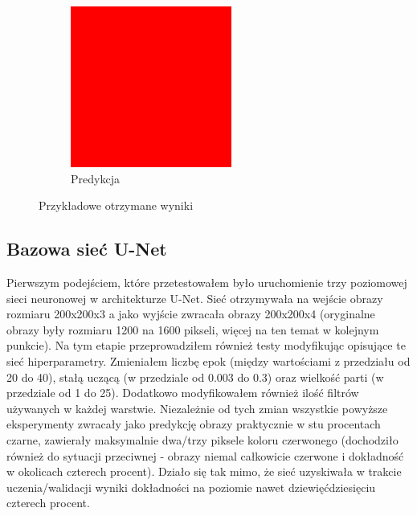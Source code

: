 \documentclass{article}
\begin{document}
\begin{figure}[H]
\begin{subfigure}{0.4\linewidth}
        \includegraphics[width=\linewidth]{images/0_0_0_prediction.png}
        \caption{Predykcja}
    \end{subfigure}
    \caption{Przykładowe otrzymane wyniki}
    \label{fig:input_and_output}
\end{figure}
\subsection{Bazowa sieć U-Net}
Pierwszym podejściem, które przetestowałem było uruchomienie trzy poziomowej sieci neuronowej w architekturze U-Net.
Sieć otrzymywała na wejście obrazy rozmiaru 200x200x3 a jako wyjście zwracała obrazy 200x200x4 (oryginalne obrazy były rozmiaru 1200 na 1600 pikseli, więcej na ten temat w kolejnym punkcie).
Na tym etapie przeprowadziłem również testy modyfikując opisujące te sieć hiperparametry.
Zmieniałem liczbę epok (między wartościami z przedziału od 20 do 40), stałą uczącą (w przedziale od 0.003 do 0.3) oraz wielkość parti (w przedziale od 1 do 25).
Dodatkowo modyfikowałem również ilość filtrów używanych w każdej warstwie.
Niezależnie od tych zmian wszystkie powyższe eksperymenty zwracały jako predykcję obrazy praktycznie w stu procentach czarne, zawierały maksymalnie dwa/trzy piksele koloru czerwonego (dochodziło również do sytuacji przeciwnej - obrazy niemal całkowicie czerwone i dokładność w okolicach czterech procent).
Działo się tak mimo, że sieć uzyskiwała w trakcie uczenia/walidacji wyniki dokładności na poziomie nawet dziewięćdziesięciu czterech procent.
\end{document}
